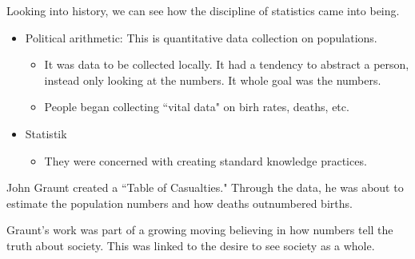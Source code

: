 \documentclass[openany]{book}
\begin{document}
Looking into history, we can see how the discipline of statistics came into being.
\begin{itemize}
	\item Political arithmetic: This is quantitative data collection on populations.
	\begin{itemize}
		\item It was data to be collected locally. It had a tendency to abstract a person, instead only looking at the numbers. It whole goal was the numbers.
		\item People began collecting ``vital data" on birh rates, deaths, etc.
	\end{itemize}
	\item Statistik
	\begin{itemize}
		\item They were concerned with creating standard knowledge practices.
	\end{itemize}
\end{itemize}

\begin{example}
	John Graunt created a ``Table of Casualties." Through the data, he was about to estimate the population numbers and how deaths outnumbered births.
\end{example}

Graunt's work was part of a growing moving believing in how numbers tell the truth about society. This was linked to the desire to see society as a whole.
\end{document}
